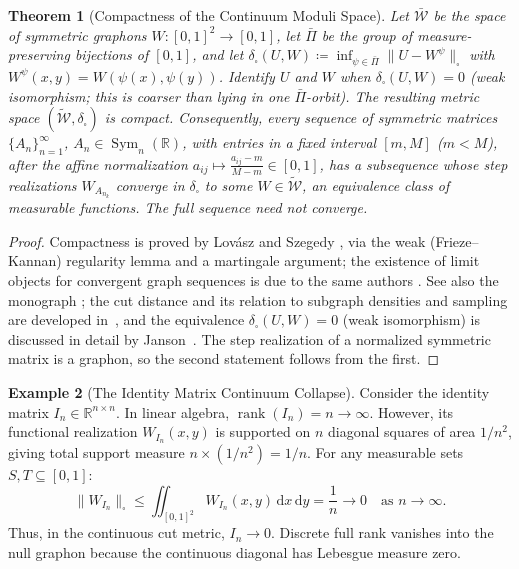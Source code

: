 \documentclass[11pt,a4paper,reqno]{amsart}
\newtheorem{theorem}{Theorem}[section]
\theoremstyle{definition}
\newtheorem{example}[theorem]{Example}
\numberwithin{equation}{section}
\newcommand{\R}{\mathbb{R}}
\newcommand{\rank}{\operatorname{rank}}
\newcommand{\cutnorm}[1]{\|#1\|_{\square}}
\newcommand{\dif}{\,\mathrm{d}}
\begin{document}
\begin{theorem}[Compactness of the Continuum Moduli Space]
\label{thm:graphon_compactness}
Let $\bar{\mathcal{W}}$ be the space of symmetric graphons $W \colon [0, 1]^2 \to [0, 1]$, let $\bar{\Pi}$ be the group of measure-preserving bijections of $[0,1]$, and let $\delta_\square(U, W) \coloneqq \inf_{\psi \in \bar\Pi} \cutnorm{U - W^\psi}$ with $W^\psi(x,y) = W(\psi(x),\psi(y))$. Identify $U$ and $W$ when $\delta_\square(U, W) = 0$ (weak isomorphism; this is coarser than lying in one $\bar\Pi$-orbit). The resulting metric space $(\widetilde{\mathcal{W}}, \delta_\square)$ is \emph{compact}. Consequently, every sequence of symmetric matrices $\{A_n\}_{n=1}^\infty$, $A_n \in \operatorname{Sym}_n(\R)$, with entries in a fixed interval $[m, M]$ ($m < M$), after the affine normalization $a_{ij} \mapsto \frac{a_{ij} - m}{M - m} \in [0, 1]$, has a subsequence whose step realizations $W_{A_{n_k}}$ converge in $\delta_\square$ to some $W \in \widetilde{\mathcal{W}}$, an equivalence class of measurable functions. The full sequence need not converge.
\end{theorem}
\begin{proof}
Compactness is proved by Lov\'asz and Szegedy \cite{lovasz2007szemeredi}, via the weak (Frieze--Kannan) regularity lemma and a martingale argument; the existence of limit objects for convergent graph sequences is due to the same authors \cite{lovasz2006limits}. See also the monograph \cite{lovasz2012large}; the cut distance and its relation to subgraph densities and sampling are developed in~\cite{borgs2008convergent}, and the equivalence $\delta_\square(U,W) = 0$ (weak isomorphism) is discussed in detail by Janson~\cite{janson2013graphons}. The step realization of a normalized symmetric matrix is a graphon, so the second statement follows from the first.
\end{proof}

\begin{example}[The Identity Matrix Continuum Collapse]
Consider the identity matrix $I_n \in \R^{n \times n}$. In linear algebra, $\rank(I_n) = n \to \infty$. However, its functional realization $W_{I_n}(x, y)$ is supported on $n$ diagonal squares of area $1/n^2$, giving total support measure $n \times (1/n^2) = 1/n$. For any measurable sets $S, T \subseteq [0, 1]$:
\begin{equation}
    \cutnorm{W_{I_n}} \le \iint_{[0,1]^2} W_{I_n}(x, y) \dif x \dif y = \frac{1}{n} \longrightarrow 0 \quad \text{as } n \to \infty.
\end{equation}
Thus, in the continuous cut metric, $I_n \to 0$. Discrete full rank vanishes into the null graphon because the continuous diagonal has Lebesgue measure zero.
\end{example}
\end{document}

